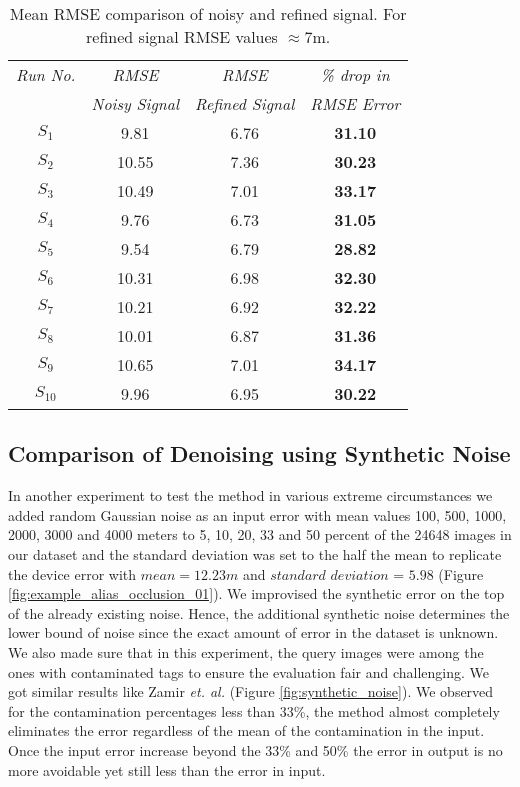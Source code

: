 \begin{table}[h]
\centering
\caption{Mean RMSE comparison of noisy and refined \gps signal. For refined
\gps signal RMSE values $\approx$7m.}
	\begin{tabular}{|c|c|c|c|}
\hline
   \textit{Run No.} & \textit{RMSE } & \textit{RMSE } & \textit{\% drop in}\\ 
    ~ & \textit{Noisy Signal} & \textit{Refined Signal} & \textit{RMSE Error} \\ \hline
    $S_1$ & 9.81 & 6.76  & \textbf{31.10} \\ \hline
    $S_2$ & 10.55 & 7.36 & \textbf{30.23} \\ \hline
    $S_3$ & 10.49 & 7.01 & \textbf{33.17} \\ \hline
    $S_4$ & 9.76 & 6.73  & \textbf{31.05} \\ \hline
    $S_5$ & 9.54 & 6.79  & \textbf{28.82} \\ \hline
    $S_6$ & 10.31 & 6.98 & \textbf{32.30} \\ \hline
    $S_7$ & 10.21 & 6.92  & \textbf{32.22} \\ \hline
    $S_8$ & 10.01 & 6.87  & \textbf{31.36} \\ \hline
    $S_9$ & 10.65 & 7.01  & \textbf{34.17} \\ \hline
    $S_{10}$ & 9.96 & 6.95  & \textbf{30.22} \\ \hline
    \end{tabular}
\label{table:rmse_mean_err_comparison}
\end{table}

\subsection{Comparison of Denoising using Synthetic Noise}
In another experiment to test the method in various extreme circumstances 
we added random Gaussian noise as an input error with mean values 100, 500, 1000, 2000, 
3000 and 4000 meters to 5, 10, 20, 33 and 50 percent of the 24648 images in 
our dataset and the standard deviation was set to the half the mean to 
replicate the \gps device error with $mean = 12.23m$ and 
$standard$ $deviation$ = $5.98$ (Figure \ref{fig:example_alias_occlusion_01}). 
We improvised the synthetic error on the top of the already existing noise. 
Hence, the additional synthetic noise determines the lower bound of 
noise since the exact amount of error in the dataset is unknown. 
We also made sure that in this experiment, the query images were among
the ones with contaminated \gps tags to ensure the evaluation fair and challenging. 
We got similar results like Zamir {\em et. al.} \cite{Zamir_2014_CVPR}(Figure \ref{fig:synthetic_noise}). We observed  for the contamination percentages less 
than 33\%, the method almost completely eliminates the error 
regardless of the mean of the contamination in the input. 
Once the input error increase beyond the 33\% and 50\% the
error in output is no more avoidable yet still less than the error in input.

